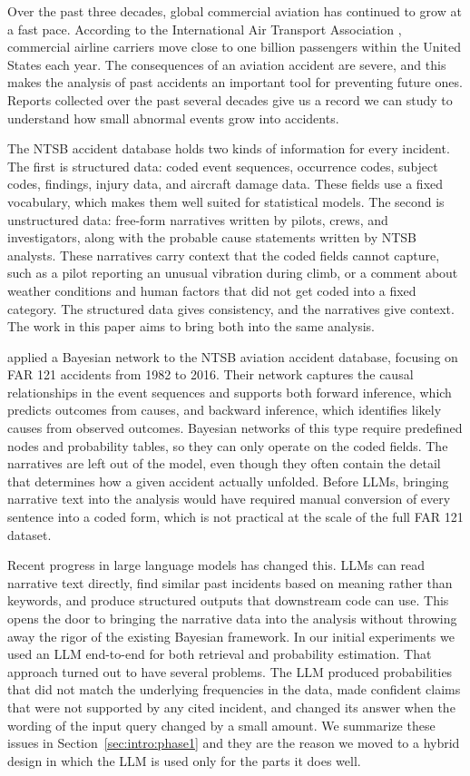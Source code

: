 \documentclass[11pt]{article}
\begin{document}
Over the past three decades, global commercial aviation has continued to grow at a fast pace. According to the International Air Transport Association \citep{IATA2019}, commercial airline carriers move close to one billion passengers within the United States each year. The consequences of an aviation accident are severe, and this makes the analysis of past accidents an important tool for preventing future ones. Reports collected over the past several decades give us a record we can study to understand how small abnormal events grow into accidents.

The NTSB accident database holds two kinds of information for every incident. The first is structured data: coded event sequences, occurrence codes, subject codes, findings, injury data, and aircraft damage data. These fields use a fixed vocabulary, which makes them well suited for statistical models. The second is unstructured data: free-form narratives written by pilots, crews, and investigators, along with the probable cause statements written by NTSB analysts. These narratives carry context that the coded fields cannot capture, such as a pilot reporting an unusual vibration during climb, or a comment about weather conditions and human factors that did not get coded into a fixed category. The structured data gives consistency, and the narratives give context. The work in this paper aims to bring both into the same analysis.

\citet{ZhangMahadevan2021} applied a Bayesian network to the NTSB aviation accident database, focusing on FAR 121 accidents from 1982 to 2016. Their network captures the causal relationships in the event sequences and supports both forward inference, which predicts outcomes from causes, and backward inference, which identifies likely causes from observed outcomes. Bayesian networks of this type require predefined nodes and probability tables, so they can only operate on the coded fields. The narratives are left out of the model, even though they often contain the detail that determines how a given accident actually unfolded. Before LLMs, bringing narrative text into the analysis would have required manual conversion of every sentence into a coded form, which is not practical at the scale of the full FAR 121 dataset.

Recent progress in large language models has changed this. LLMs can read narrative text directly, find similar past incidents based on meaning rather than keywords, and produce structured outputs that downstream code can use. This opens the door to bringing the narrative data into the analysis without throwing away the rigor of the existing Bayesian framework. In our initial experiments we used an LLM end-to-end for both retrieval and probability estimation. That approach turned out to have several problems. The LLM produced probabilities that did not match the underlying frequencies in the data, made confident claims that were not supported by any cited incident, and changed its answer when the wording of the input query changed by a small amount. We summarize these issues in Section~\ref{sec:intro:phase1} and they are the reason we moved to a hybrid design in which the LLM is used only for the parts it does well.
\end{document}
